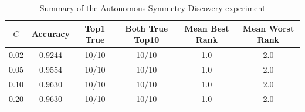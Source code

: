 \begin{table}[H]
\centering
\caption{Summary of the Autonomous Symmetry Discovery experiment}
\label{tab:l1summary}
\begin{tabular}{cccccc}
\toprule
$C$
& Accuracy
& Top1 True
& Both True Top10
& Mean Best Rank
& Mean Worst Rank \\
\midrule
0.02 & 0.9244 & 10/10 & 10/10 & 1.0 & 2.0 \\
0.05 & 0.9554 & 10/10 & 10/10 & 1.0 & 2.0 \\
0.10 & 0.9630 & 10/10 & 10/10 & 1.0 & 2.0 \\
0.20 & 0.9630 & 10/10 & 10/10 & 1.0 & 2.0 \\
\bottomrule
\end{tabular}
\end{table}
